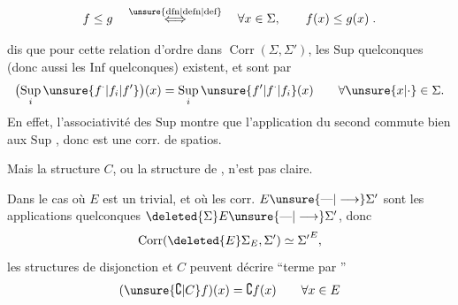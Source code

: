 \[
 f\leq g\quad\overset{\text{\unsure{dfn|defn|def}}}{\Longleftrightarrow}\quad
 \forall x\in\Sigma,\qquad f(x)\leq g(x)\;.
\]

 dis que pour cette relation d'ordre dans $\operatorname{Corr}(\Sigma,\Sigma')$, les $\mathrm{Sup}$ quelconques (donc aussi les $\mathrm{Inf}$ quelconques) existent, et sont  par
\[
 \bigl(\mathop{\mathrm{Sup}}\limits_i \unsure{f^{\cdot}|f_i|f'}\bigr)(x)
 =\mathop{\mathrm{Sup}}\limits_i \unsure{f^{\prime}|f^{\cdot}|f_i}(x)\qquad\forall \unsure{x|\cdot}\in\Sigma.
\]
En effet, l'associativité des $\mathrm{Sup}$ montre que l'application du second  commute bien aux $\mathrm{Sup}$ , donc est une corr. de spatios.

Mais la structure $C$, ou la structure de , n'est pas claire.

Dans le cas où $E$ est un  trivial,  et où les corr. $E\unsure{\mbox{---}|\longrightarrow}\Sigma'$ sont  les applications quelconques $\deleted{\Sigma}E\unsure{\mbox{---}|\longrightarrow}\Sigma'$, donc
\[
 \operatorname{Corr}(\deleted{E}\Sigma_E,\Sigma')\simeq{\Sigma'}^{E},
\]
les structures de disjonction et $C$ peuvent  décrire ``terme par ''
\[
 (\unsure{\complement|C} f)(x)=\complement f(x)\qquad\forall x\in E
\]
